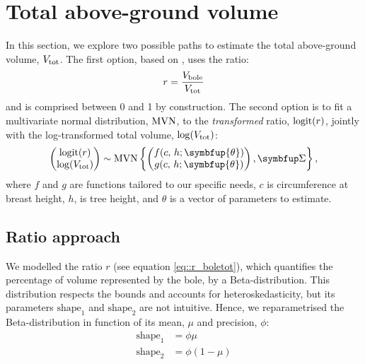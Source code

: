 \chapter{Total above-ground volume\label{chap::total_v}}

In this section, we explore two possible paths to estimate the total above-ground volume, \( V_{\text{tot}} \). The first option, based on \cite{Longuetaud2013}, uses the ratio:
\begin{equation}
	r = \frac{V_{\text{bole}}}{V_{\text{tot}}} \label{eq::r_boletot}
\end{equation}
and is comprised between 0 and 1 by construction. The second option is to fit a multivariate normal distribution, \( \operatorname{MVN} \), to the \textit{transformed} ratio, \( \operatorname{logit}(r) \), jointly with the log-transformed total volume, \( \log(V_{\text{tot}}) \):
\begin{equation}
	\begin{pmatrix}
		\logit(r) \\
		\log(\Vtot)
	\end{pmatrix}
	\sim
	\MVN\left\{ \begin{pmatrix}
		f(c, \, h; \symbfup{\theta}) \\
		g(c, \, h; \symbfup{\theta}) \\
	\end{pmatrix}, \Sigmabf \right\},
	\label{eq::mvn}
\end{equation}
where \( f \) and \( g \) are functions tailored to our specific needs, \( c \) is circumference at breast height, \( h \), is tree height, and \( \theta \) is a vector of parameters to estimate.

\section{Ratio approach}

We modelled the ratio \( r \) (see equation \eqref{eq::r_boletot}), which quantifies the percentage of volume represented by the bole, by a Beta-distribution. This distribution respects the bounds and accounts for heteroskedasticity, but its parameters \( \text{shape}_1 \) and \( \text{shape}_2 \) are not intuitive. Hence, we reparametrised the Beta-distribution in function of its mean, \( \mu \) and precision, \( \phi \):
\begin{align*}
	\text{shape}_1 &= \phi \mu \\
	\text{shape}_2 &= \phi (1 - \mu)
\end{align*}

